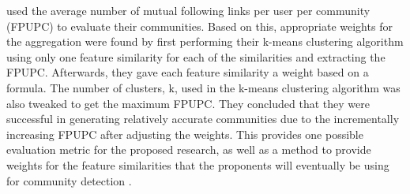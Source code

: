  used the average number of mutual following links per user per community (FPUPC) to evaluate their communities. Based on this, appropriate weights for the aggregation were found by first performing their k-means clustering algorithm using only one feature similarity for each of the similarities and extracting the FPUPC. Afterwards, they gave each feature similarity a weight based on a formula. The number of clusters, k, used in the k-means clustering algorithm was also tweaked to get the maximum FPUPC. They concluded that they were successful in generating relatively accurate communities due to the incrementally increasing FPUPC after adjusting the weights. This provides one possible evaluation metric for the proposed research, as well as a method to provide weights for the feature similarities that the proponents will eventually be using for community detection \cite{Zhang:2012}.

